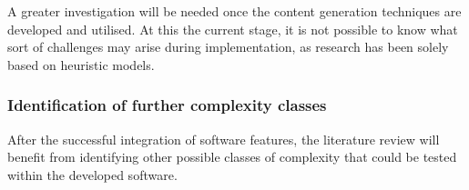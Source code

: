 \documentclass[11pt, a4paper, oneside]{report} %
\begin{document}
A greater investigation will be needed once the content generation techniques are developed and
utilised. At this the current stage, it is not possible to know what sort of challenges may arise
during implementation, as research has been solely based on heuristic models.

\subsubsection{Identification of further complexity classes}

After the successful integration of software features, the literature review will benefit from
identifying other possible classes of complexity that could be tested within the developed
software.








 

\end{document}
